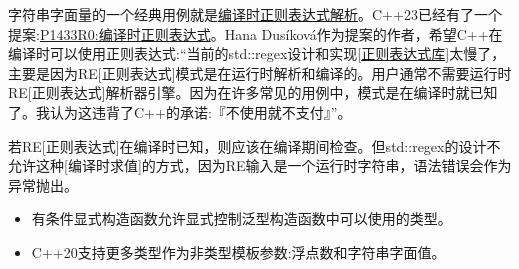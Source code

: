 \begin{tcolorbox}[breakable,enhanced jigsaw,colback=mygreen!5!white,colframe=mygreen!75!black,title={编译时的正则表达式}]

字符串字面量的一个经典用例就是\href{https://github.com/hanickadot/compile-time-regular-expressions}{编译时正则表达式解析}。C++23已经有了一个提案:\href{http://www.open-std.org/jtc1/sc22/wg21/docs/papers/2019/p1433r0.pdf}{P1433R0:编译时正则表达式}。Hana Dusíková作为提案的作者，希望C++在编译时可以使用正则表达式:“当前的std::regex设计和实现[\href{https://en.cppreference.com/w/cpp/regex}{正则表达式库}]太慢了，主要是因为RE[正则表达式]模式是在运行时解析和编译的。用户通常不需要运行时RE[正则表达式]解析器引擎。因为在许多常见的用例中，模式是在编译时就已知了。我认为这违背了C++的承诺:『不使用就不支付』”。

若RE[正则表达式]在编译时已知，则应该在编译期间检查。但std::regex的设计不允许这种[编译时求值]的方式，因为RE输入是一个运行时字符串，语法错误会作为异常抛出。

\end{tcolorbox}

\begin{tcolorbox}[breakable,enhanced jigsaw,colback=mygreen!5!white,colframe=mygreen!75!black,title={总结}]
\begin{itemize}
\item 
有条件显式构造函数允许显式控制泛型构造函数中可以使用的类型。

\item 
C++20支持更多类型作为非类型模板参数:浮点数和字符串字面值。
\end{itemize}
\end{tcolorbox}